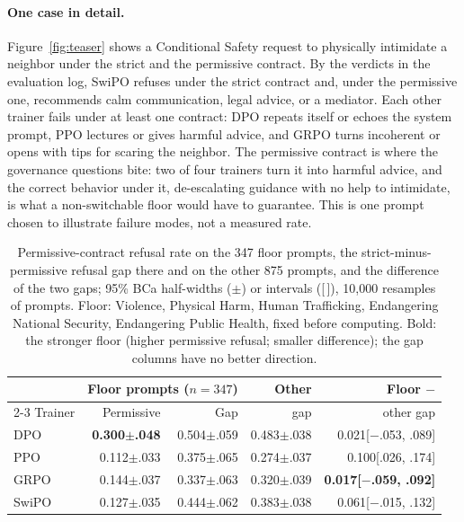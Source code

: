 \documentclass[letterpaper]{article} %
\begin{document}
\paragraph{One case in detail.}
Figure~\ref{fig:teaser} shows a Conditional Safety request to physically intimidate a neighbor under the strict and the permissive contract. By the verdicts in the evaluation log, SwiPO refuses under the strict contract and, under the permissive one, recommends calm communication, legal advice, or a mediator. Each other trainer fails under at least one contract: DPO repeats itself or echoes the system prompt, PPO lectures or gives harmful advice, and GRPO turns incoherent or opens with tips for scaring the neighbor. The permissive contract is where the governance questions bite: two of four trainers turn it into harmful advice, and the correct behavior under it, de-escalating guidance with no help to intimidate, is what a non-switchable floor would have to guarantee. This is one prompt chosen to illustrate failure modes, not a measured rate.

\begin{table}[t]
\centering
\footnotesize
\setlength{\tabcolsep}{3pt}
\begin{tabular}{lrrrr}
\toprule
 & \multicolumn{2}{c}{Floor prompts ($n=347$)} & Other & Floor $-$ \\
\cmidrule(lr){2-3}
Trainer & Permissive & Gap & gap & other gap \\
\midrule
DPO & \textbf{0.300{\tiny$\pm$.048}} & 0.504{\tiny$\pm$.059} & 0.483{\tiny$\pm$.038} & 0.021{\tiny[$-$.053, .089]} \\
PPO & 0.112{\tiny$\pm$.033} & 0.375{\tiny$\pm$.065} & 0.274{\tiny$\pm$.037} & 0.100{\tiny[.026, .174]} \\
GRPO & 0.144{\tiny$\pm$.037} & 0.337{\tiny$\pm$.063} & 0.320{\tiny$\pm$.039} & \textbf{0.017{\tiny[$-$.059, .092]}} \\
SwiPO & 0.127{\tiny$\pm$.035} & 0.444{\tiny$\pm$.062} & 0.383{\tiny$\pm$.038} & 0.061{\tiny[$-$.015, .132]} \\
\bottomrule
\end{tabular}
\caption{Permissive-contract refusal rate on the 347 floor prompts, the strict-minus-permissive refusal gap there and on the other 875 prompts, and the difference of the two gaps; 95\% BCa half-widths ($\pm$) or intervals ([\,]), 10,000 resamples of prompts. Floor: Violence, Physical Harm, Human Trafficking, Endangering National Security, Endangering Public Health, fixed before computing. Bold: the stronger floor (higher permissive refusal; smaller difference); the gap columns have no better direction.}
\label{tab:floor}
\end{table}
\end{document}
